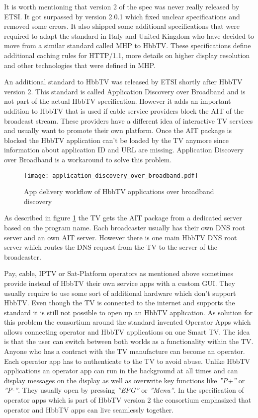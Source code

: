 It is worth mentioning that version 2 of the spec was never really released by ETSI. It got surpassed by version 2.0.1 which fixed unclear specifications and removed some errors. It also shipped some additional specifications that were required to adapt the standard in Italy and United Kingdom who have decided to move from a similar standard called MHP to HbbTV. These specifications define additional caching rules for HTTP/1.1, more details on higher display resolution and other technologies that were defined in MHP.

An additional standard to HbbTV was released by ETSI shortly after HbbTV version 2. This standard is called Application Discovery over Broadband and is not part of the actual HbbTV specification. However it adds an important addition to HbbTV that is used if cable service providers block the AIT of the broadcast stream. These providers have a different idea of interactive TV services and usually want to promote their own platform. Once the AIT package is blocked the HbbTV application can't be loaded by the TV anymore since information about application ID and URL are missing. Application Discovery over Broadband is a workaround to solve this problem.

\begin{figure}[htb]
  \centering
  \texttt{[image: application\_discovery\_over\_broadband.pdf]}\\
  \caption{App delivery workflow of HbbTV applications over broadband discovery}\label{fig:application_discovery_over_broadband}
\end{figure}

As described in figure \ref{fig:application_discovery_over_broadband} the TV gets the AIT package from a dedicated server based on the program name. Each broadcaster usually has their own DNS root server and an own AIT server. However there is one main HbbTV DNS root server which routes the DNS request from the TV to the server of the broadcaster.

Pay, cable, IPTV or Sat-Platform operators as mentioned above sometimes provide instead of HbbTV their own service apps with a custom GUI. They usually require to use some sort of additional hardware which don't support HbbTV. Even though the TV is connected to the internet and supports the standard it is still not possible to open up an HbbTV application. As solution for this problem the consortium around the standard invented Operator Apps which allows connecting operator and HbbTV applications on one Smart TV. The idea is that the user can switch between both worlds as a functionality within the TV. Anyone who has a contract with the TV manufacture can become an operator. Each operator app has to authenticate to the TV to avoid abuse. Unlike HbbTV applications an operator app can run in the background at all times and can display messages on the display as well as overwrite key functions like \textit{''P+''} or \textit{''P-''}. They usually open by pressing \textit{''EPG''} or \textit{''Menu''}. In the specification of operator apps which is part of HbbTV version 2 the consortium emphasized that operator and HbbTV apps can live seamlessly together.

